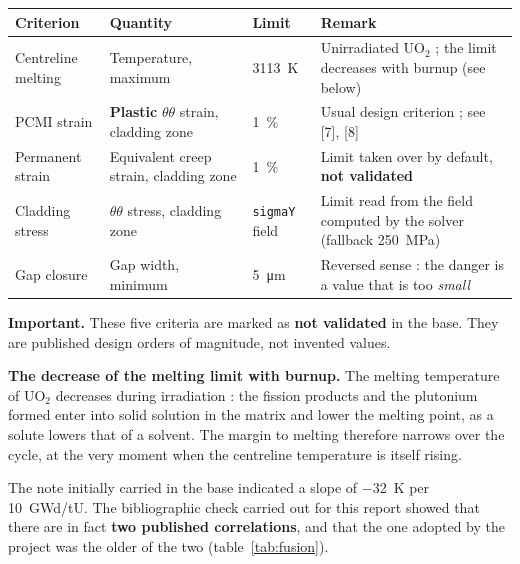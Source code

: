 \documentclass[12pt,a4paper]{report}
\begin{document}
\noindent
\begin{tabularx}{\textwidth}{@{}>{\raggedright\arraybackslash}p{3.3cm}
                                >{\raggedright\arraybackslash}p{2.2cm}
                                >{\raggedright\arraybackslash}p{1.9cm}
                                X@{}}
\toprule
\textbf{Criterion} & \textbf{Quantity} & \textbf{Limit} & \textbf{Remark}\\
\midrule
Centreline melting & Temperature, maximum & \SI{3113}{\kelvin} &
  Unirradiated $\mathrm{UO_2}$ ; the limit decreases with burnup (see
  below)\\
PCMI strain & \textbf{Plastic} $\theta\theta$ strain, cladding zone &
  \SI{1}{\percent} & Usual design criterion ; see [7], [8]\\
Permanent strain & Equivalent creep strain, cladding zone &
  \SI{1}{\percent} & Limit taken over by default, \textbf{not validated}\\
Cladding stress & $\theta\theta$ stress, cladding zone &
  \texttt{sigmaY} field & Limit read from the field computed by the solver
  (fallback \SI{250}{\mega\pascal})\\
Gap closure & Gap width, minimum & \SI{5}{\micro\metre} &
  Reversed sense : the danger is a value that is too \emph{small}\\
\bottomrule
\end{tabularx}

\vspace{0.4cm}
\noindent
\textcolor{cAlert}{\textbf{Important.}} These five criteria are marked as
\textbf{not validated} in the base. They are published design orders of
magnitude, not invented values.

\vspace{0.4cm}
\noindent
\textbf{The decrease of the melting limit with burnup.} The melting temperature
of $\mathrm{UO_2}$ decreases during irradiation : the fission products and the
plutonium formed enter into solid solution in the matrix and lower the melting
point, as a solute lowers that of a solvent. The margin to melting therefore
narrows over the cycle, at the very moment when the centreline temperature is
itself rising.

The note initially carried in the base indicated a slope of \SI{-32}{\kelvin}
per \num{10}~GWd/tU. The bibliographic check carried out for this report showed
that there are in fact \textbf{two published correlations}, and that the one
adopted by the project was the older of the two (table~\ref{tab:fusion}).
\end{document}
